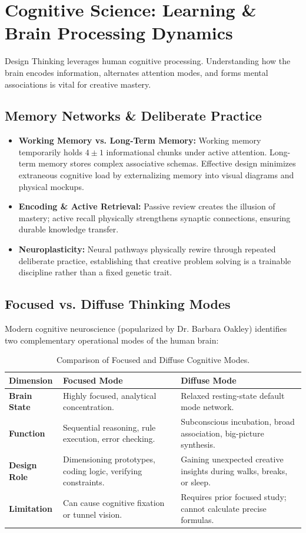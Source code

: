 \section{Cognitive Science: Learning \& Brain Processing Dynamics}

Design Thinking leverages human cognitive processing. Understanding how the brain encodes information, alternates attention modes, and forms mental associations is vital for creative mastery.

\subsection{Memory Networks \& Deliberate Practice}
\begin{itemize}[leftmargin=1.2em, itemsep=3pt]
    \item \textbf{Working Memory vs. Long-Term Memory:} Working memory temporarily holds $4 \pm 1$ informational chunks under active attention. Long-term memory stores complex associative schemas. Effective design minimizes extraneous cognitive load by externalizing memory into visual diagrams and physical mockups.
    \item \textbf{Encoding \& Active Retrieval:} Passive review creates the illusion of mastery; active recall physically strengthens synaptic connections, ensuring durable knowledge transfer.
    \item \textbf{Neuroplasticity:} Neural pathways physically rewire through repeated deliberate practice, establishing that creative problem solving is a trainable discipline rather than a fixed genetic trait.
\end{itemize}

\subsection{Focused vs. Diffuse Thinking Modes}
Modern cognitive neuroscience (popularized by Dr. Barbara Oakley) identifies two complementary operational modes of the human brain:

\begin{table}[h!]
\centering
\small
\renewcommand{\arraystretch}{1.3}
\begin{tabularx}{\linewidth}{p{3.2cm}X X}
\toprule
\textbf{Dimension} & \textbf{Focused Mode} & \textbf{Diffuse Mode} \\
\midrule
\textbf{Brain State} & Highly focused, analytical concentration. & Relaxed resting-state default mode network. \\
\textbf{Function} & Sequential reasoning, rule execution, error checking. & Subconscious incubation, broad association, big-picture synthesis. \\
\textbf{Design Role} & Dimensioning prototypes, coding logic, verifying constraints. & Gaining unexpected creative insights during walks, breaks, or sleep. \\
\textbf{Limitation} & Can cause cognitive fixation or tunnel vision. & Requires prior focused study; cannot calculate precise formulas. \\
\bottomrule
\end{tabularx}
\caption{Comparison of Focused and Diffuse Cognitive Modes.}
\end{table}

